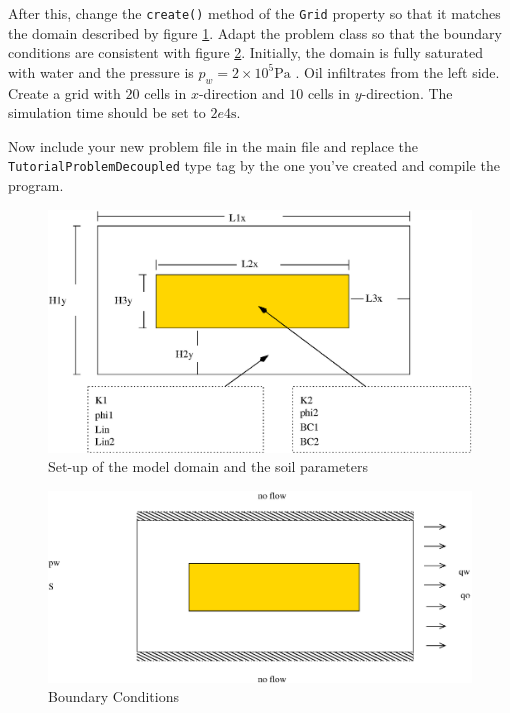 After this, change the \texttt{create()} method of the \texttt{Grid}
property so that it matches the domain described
by figure \ref{tutorial-decoupled:ex2_Domain}. Adapt the problem class
so that the boundary conditions are consistent with figure
\ref{tutorial-decoupled:ex2_BC}. Initially, the domain is fully saturated
with water and the pressure is $p_w = 2 \times 10^5 \text{Pa}$ . Oil
infiltrates from the left side. Create a grid with $20$ cells in
$x$-direction and $10$ cells in $y$-direction. The simulation time
should be set to $2e4 \text{s}$.

Now include your new problem file in the main file and replace the
\texttt{TutorialProblemDecoupled} type tag by the one you've created and
compile the program.


\begin{figure}[ht]
\centering
\includegraphics[width=0.8\linewidth,keepaspectratio]{EPS/Ex2_Domain.eps}
\caption{Set-up of the model domain and the soil parameters}\label{tutorial-decoupled:ex2_Domain}
\end{figure}

\begin{figure}[ht]
\centering
\includegraphics[width=0.8\linewidth,keepaspectratio]{EPS/Ex2_Boundary.eps}
\caption{Boundary Conditions}\label{tutorial-decoupled:ex2_BC}
\end{figure}

